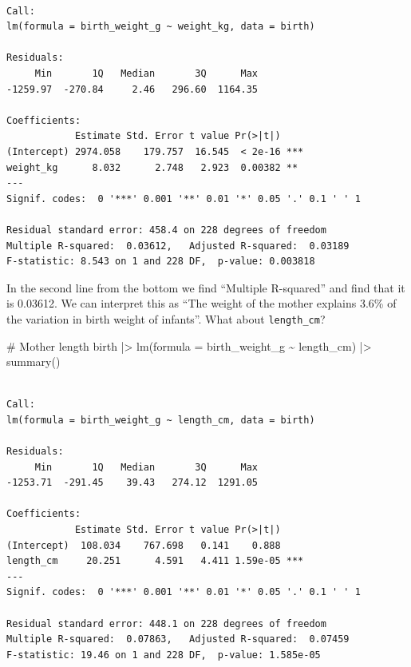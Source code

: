 \documentclass[
  letterpaper,
  DIV=11,
  numbers=noendperiod]{scrreprt}
\newenvironment{Shaded}{\begin{snugshade}}{\end{snugshade}}
\newcommand{\AttributeTok}[1]{\textcolor[rgb]{0.40,0.45,0.13}{#1}}
\newcommand{\CommentTok}[1]{\textcolor[rgb]{0.37,0.37,0.37}{#1}}
\newcommand{\FunctionTok}[1]{\textcolor[rgb]{0.28,0.35,0.67}{#1}}
\newcommand{\NormalTok}[1]{\textcolor[rgb]{0.00,0.23,0.31}{#1}}
\newcommand{\SpecialCharTok}[1]{\textcolor[rgb]{0.37,0.37,0.37}{#1}}
\begin{document}
\begin{verbatim}

Call:
lm(formula = birth_weight_g ~ weight_kg, data = birth)

Residuals:
     Min       1Q   Median       3Q      Max 
-1259.97  -270.84     2.46   296.60  1164.35 

Coefficients:
            Estimate Std. Error t value Pr(>|t|)    
(Intercept) 2974.058    179.757  16.545  < 2e-16 ***
weight_kg      8.032      2.748   2.923  0.00382 ** 
---
Signif. codes:  0 '***' 0.001 '**' 0.01 '*' 0.05 '.' 0.1 ' ' 1

Residual standard error: 458.4 on 228 degrees of freedom
Multiple R-squared:  0.03612,   Adjusted R-squared:  0.03189 
F-statistic: 8.543 on 1 and 228 DF,  p-value: 0.003818
\end{verbatim}

In the second line from the bottom we find ``Multiple R-squared'' and
find that it is 0.03612. We can interpret this as ``The weight of the
mother explains 3.6\% of the variation in birth weight of infants''.
What about \texttt{length\_cm}?

\begin{Shaded}
\begin{Highlighting}[]
\CommentTok{\# Mother length}
\NormalTok{birth }\SpecialCharTok{|\textgreater{}} 
  \FunctionTok{lm}\NormalTok{(}\AttributeTok{formula =}\NormalTok{ birth\_weight\_g }\SpecialCharTok{\textasciitilde{}}\NormalTok{ length\_cm) }\SpecialCharTok{|\textgreater{}} 
  \FunctionTok{summary}\NormalTok{()}
\end{Highlighting}
\end{Shaded}

\begin{verbatim}

Call:
lm(formula = birth_weight_g ~ length_cm, data = birth)

Residuals:
     Min       1Q   Median       3Q      Max 
-1253.71  -291.45    39.43   274.12  1291.05 

Coefficients:
            Estimate Std. Error t value Pr(>|t|)    
(Intercept)  108.034    767.698   0.141    0.888    
length_cm     20.251      4.591   4.411 1.59e-05 ***
---
Signif. codes:  0 '***' 0.001 '**' 0.01 '*' 0.05 '.' 0.1 ' ' 1

Residual standard error: 448.1 on 228 degrees of freedom
Multiple R-squared:  0.07863,   Adjusted R-squared:  0.07459 
F-statistic: 19.46 on 1 and 228 DF,  p-value: 1.585e-05
\end{verbatim}
\end{document}
